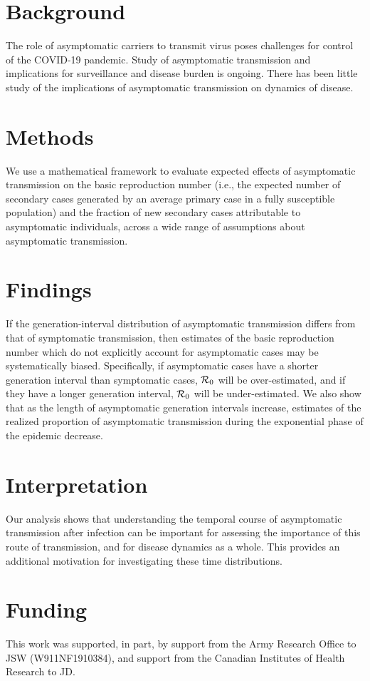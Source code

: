 {\footnotesize 
\section*{Background}

The role of asymptomatic carriers to transmit virus poses challenges for control of the COVID-19 pandemic. 
Study of asymptomatic transmission and implications for surveillance and disease burden is ongoing. 
There has been little study of the implications of asymptomatic transmission on dynamics of disease.

\section*{Methods}

We use a mathematical framework to evaluate expected effects of asymptomatic transmission on the basic reproduction number (i.e., the expected number of secondary cases generated by an average primary case in a fully susceptible population) and the fraction of new secondary cases attributable to asymptomatic individuals, across a wide range of assumptions about asymptomatic transmission.

\section*{Findings}

If the generation-interval distribution of asymptomatic transmission differs from that of symptomatic transmission, then estimates of the basic reproduction number which do not explicitly account for asymptomatic cases may be systematically biased. 
Specifically, if asymptomatic cases have a shorter generation interval than symptomatic cases, ${\cal{R}}_0$ will be over-estimated, and if they have a longer generation interval, ${\cal{R}}_0$ will be under-estimated.
We also show that as the length of asymptomatic generation intervals increase, estimates of the realized proportion of asymptomatic transmission during the exponential phase of the epidemic decrease.

\section*{Interpretation}

Our analysis shows that understanding the temporal course of asymptomatic transmission after infection can be important for assessing the importance of this route of transmission, and for disease dynamics as a whole. This provides an additional motivation for investigating these time distributions. 

\section*{Funding}

This work was supported, in part, by support from the Army Research Office to JSW (W911NF1910384), and support from the Canadian Institutes of Health Research to JD.}
